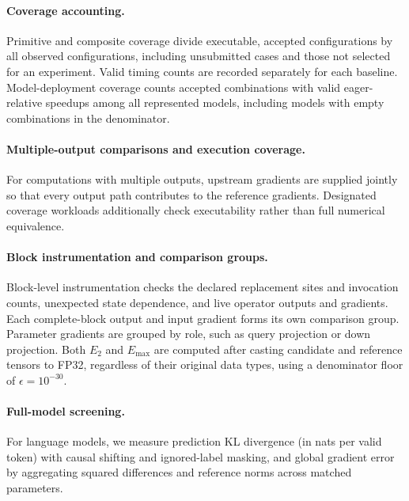\paragraph{Coverage accounting.}
Primitive and composite coverage divide executable, accepted configurations by all observed configurations, including unsubmitted cases and those not selected for an experiment. Valid timing counts are recorded separately for each baseline. Model-deployment coverage counts accepted combinations with valid eager-relative speedups among all represented models, including models with empty combinations in the denominator.





\paragraph{Multiple-output comparisons and execution coverage.}
For computations with multiple outputs, upstream gradients are
supplied jointly so that every output path contributes to the
reference gradients. Designated coverage workloads additionally
check executability rather than full numerical equivalence.


\paragraph{Block instrumentation and comparison groups.}
Block-level instrumentation checks the declared replacement sites
and invocation counts, unexpected state dependence, and live
operator outputs and gradients. Each complete-block output and
input gradient forms its own comparison group. Parameter gradients
are grouped by role, such as query projection or down projection. Both $E_2$ and $E_{\max}$ are computed after casting candidate and reference tensors to FP32, regardless of their original data types, using a denominator floor of $\epsilon=10^{-30}$.





\paragraph{Full-model screening.}
For language models, we measure prediction KL divergence
(in nats per valid token) with causal shifting and
ignored-label masking, and global gradient error by
aggregating squared differences and reference norms
across matched parameters.


